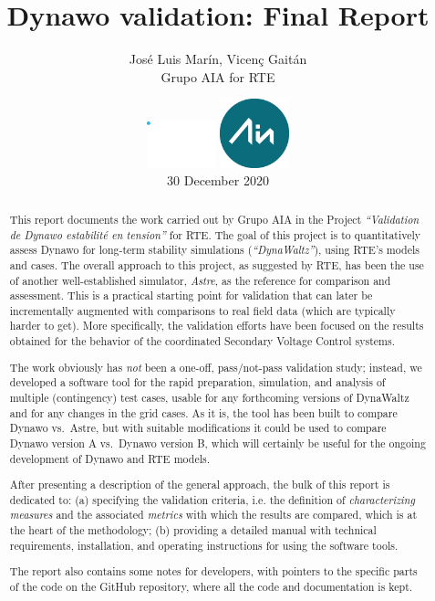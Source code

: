 \documentclass[11pt, a4paper, twoside, titlepage]{article}
\title{Dynawo validation: Final Report}
\author{José Luis Marín, Vicenç Gaitán \\
	Grupo AIA for RTE}
\date{
  \vspace{2cm}
  \includegraphics[width=2cm]{logos/Logo_RTE.pdf}
  \includegraphics[width=2cm]{logos/Logo-pequeno.png}\\
  \vspace{1cm}
  30 December 2020
}
\begin{document}
\hypersetup{pageanchor=false}
\begin{titlepage}
  \maketitle
\end{titlepage}
\hypersetup{pageanchor=true}

\begin{abstract}
  This report documents the work carried out by Grupo AIA in the
  Project \emph{``Validation de Dynawo estabilité en tension''} for
  RTE. The goal of this project is to quantitatively assess Dynawo for
  long-term stability simulations (\emph{``DynaWaltz''}), using RTE's
  models and cases. The overall approach to this project, as suggested
  by RTE, has been the use of another well-established simulator,
  \emph{Astre}, as the reference for comparison and assessment.  This
  is a practical starting point for validation that can later be
  incrementally augmented with comparisons to real field data (which
  are typically harder to get). More specifically, the validation
  efforts have been focused on the results obtained for the behavior of
  the coordinated Secondary Voltage Control systems.

  The work obviously has \emph{not} been a one-off, pass/not-pass
  validation study; instead, we developed a software tool for the
  rapid preparation, simulation, and analysis of multiple
  (contingency) test cases, usable for any forthcoming versions of
  DynaWaltz and for any changes in the grid cases. As it is, the tool
  has been built to compare Dynawo vs.\ Astre, but with suitable
  modifications it could be used to compare Dynawo version A
  vs.\ Dynawo version B, which will certainly be useful for the
  ongoing development of Dynawo and RTE models.

  After presenting a description of the general approach, the bulk of
  this report is dedicated to: (a) specifying the validation criteria,
  i.e. the definition of \emph{characterizing measures} and the
  associated \emph{metrics} with which the results are compared, which
  is at the heart of the methodology; (b) providing a detailed manual
  with technical requirements, installation, and operating instructions
  for using the software tools.
  
  The report also contains some notes for developers, with pointers to
  the specific parts of the code on the GitHub repository, where all
  the code and documentation is kept.
\end{abstract}
\end{document}
